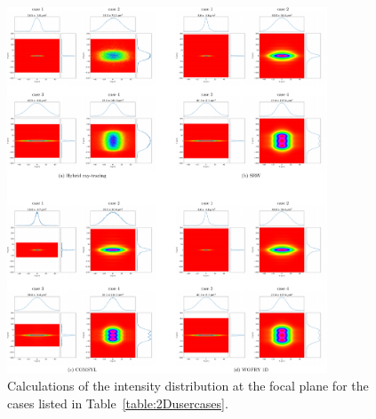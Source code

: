 \documentclass{iucr}              %
\begin{document}
\begin{figure}
    \label{fig:sim_results}
    \includegraphics[width=0.85\textwidth]{figures/fig_sim_results.pdf}
    \caption{Calculations of the intensity distribution at the focal plane for the cases listed in Table~\ref{table:2Dusercases}.}
\end{figure}





\end{document}
